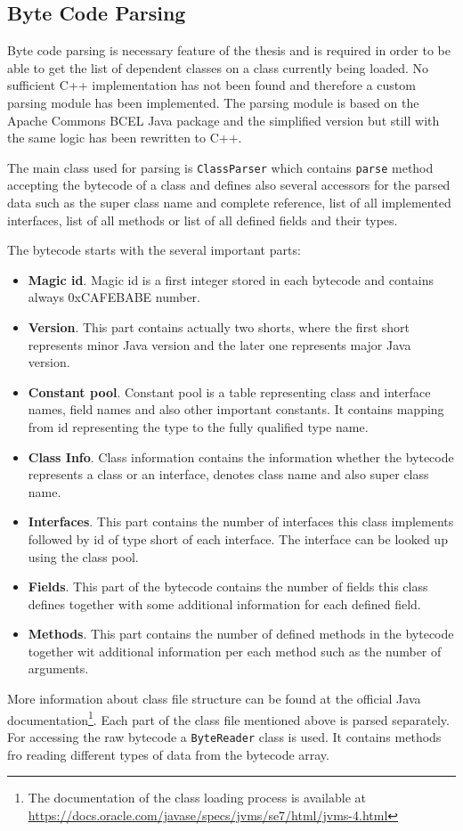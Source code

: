 \subsection{Byte Code Parsing}
Byte code parsing is necessary feature of the thesis and is required in order to be able to get the list of dependent classes on a class currently being loaded. No sufficient C++ implementation has not been found and therefore a custom parsing module has been implemented. The parsing module is based on the Apache Commons BCEL Java package and the simplified version but still with the same logic has been rewritten to C++.

The main class used for parsing is \texttt{ClassParser} which contains \texttt{parse} method accepting the bytecode of a class and defines also several accessors  for the parsed data such as the super class name and complete reference, list of all implemented interfaces, list of all methods or list of all defined fields and their types.

The bytecode starts with the several important parts:
\begin{itemize}
	\item \textbf{Magic id}. Magic id is a first integer stored in each bytecode and contains  always 0xCAFEBABE number.
	\item \textbf{Version}. This part contains actually two shorts, where the first short represents minor Java version and the later one represents major Java version.
	\item \textbf{Constant pool}. Constant pool is a table representing class and interface names, field names and also other important constants. It contains mapping from id representing the type to the fully qualified type name.
	\item \textbf{Class Info}. Class information contains the information whether the bytecode represents a class or an interface, denotes class name and also super class name.
	\item \textbf{Interfaces}. This part contains the number of interfaces this class implements followed by id of type short of each interface. The interface can be looked up using the class pool.
	\item \textbf{Fields}. This part of the bytecode contains the number of fields this class defines together with some additional information for each defined field.
	\item \textbf{Methods}. This part contains the number of defined methods in the bytecode together wit additional information per each method such as the number of arguments.
\end{itemize}
More information about class file structure can be found at the official Java documentation\footnote{The documentation of the class loading process is available at \url{https://docs.oracle.com/javase/specs/jvms/se7/html/jvms-4.html}}.
Each part of the class file mentioned above is parsed separately. For accessing the raw bytecode a \texttt{ByteReader} class is used. It contains methods fro reading different types of data from the bytecode array. 

